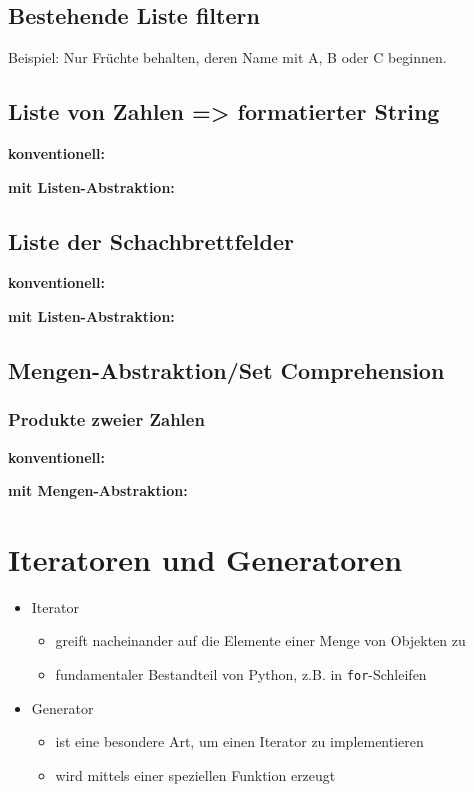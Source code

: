 \subsection{Bestehende Liste filtern}
Beispiel: Nur Früchte behalten, deren Name mit A, B oder C beginnen.


\subsection{Liste von Zahlen => formatierter String}
\textbf{konventionell:}

\textbf{mit Listen-Abstraktion:}


\subsection{Liste der Schachbrettfelder}
\textbf{konventionell:}

\textbf{mit Listen-Abstraktion:}


\subsection{Mengen-Abstraktion/Set Comprehension}

\subsubsection{Produkte zweier Zahlen}
\textbf{konventionell:}

\textbf{mit Mengen-Abstraktion:}


\section{Iteratoren und Generatoren}
\begin{itemize}
	\item Iterator
	\begin{itemize}
		\item greift nacheinander auf die Elemente einer Menge von Objekten zu
		\item fundamentaler Bestandteil von Python, z.B. in \texttt{for}-Schleifen
	\end{itemize}
	\item Generator
	\begin{itemize}
		\item ist eine besondere Art, um einen Iterator zu implementieren
		\item wird mittels einer speziellen Funktion erzeugt
	\end{itemize}
\end{itemize}

